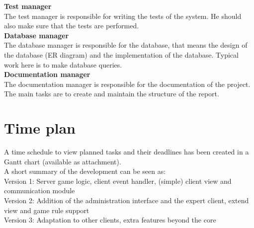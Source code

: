 \textbf{Test manager}\\
The test manager is responsible for writing the tests of the system. He should 
also make sure that the tests are performed.
\\\newline
\textbf{Database manager}\\
The database manager is responsible for the database, that means the design of the database (ER diagram) and the implementation of the database. Typical work here is to make database queries. 
\\\newline
\textbf{Documentation manager}\\
The documentation manager is responsible for the documentation of the project. The main tasks are to create and maintain the structure of the report.




\section{Time plan}
A time schedule to view planned tasks and their deadlines has been created in a 
Gantt chart (available as attachment). 
\\\newline
A short summary of the development can be seen as:\\
Version 1: Server game logic, client event handler, (simple) client view and 
communication module \\
Version 2: Addition of the administration interface and the expert client, 
extend view and game rule support\\
Version 3: Adaptation to other clients, extra features beyond the core \\


